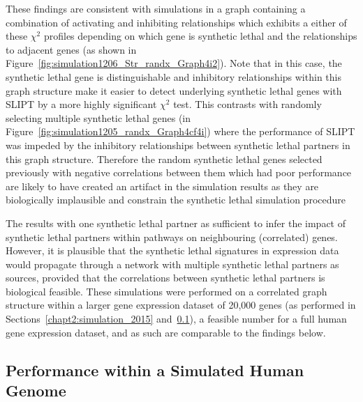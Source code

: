 These findings are consistent with simulations in a graph containing a combination of activating and inhibiting relationships which exhibits a either of these $\chi^2$ profiles depending on which gene is synthetic lethal and the relationships to adjacent genes (as shown in Figure~\ref{fig:simulation1206_Str_randx_Graph4i2}). Note that in this case, the synthetic lethal gene is distinguishable and inhibitory relationships within this graph structure make it easier to detect underlying synthetic lethal genes with \gls{SLIPT} by a more highly significant $\chi^2$ test. This contrasts with randomly selecting multiple synthetic lethal genes (in Figure~\ref{fig:simulation1205_randx_Graph4cf4i}) where the performance of \gls{SLIPT} was impeded by the inhibitory relationships between synthetic lethal partners in this graph structure. Therefore the random synthetic lethal genes selected previously with negative correlations between them which had poor performance are likely to have created an artifact in the simulation results as they are biologically implausible and constrain the synthetic lethal simulation procedure

The results with one synthetic lethal partner as sufficient to infer the impact of synthetic lethal partners within pathways on neighbouring (correlated) genes. However,  it is plausible that the synthetic lethal signatures in expression data would propagate through a network with multiple synthetic lethal partners as sources, provided that the correlations between synthetic lethal partners is biological feasible. These simulations were performed on a correlated graph structure within a larger gene expression dataset of 20,000 genes (as performed in Sections~\ref{chapt2:simulation_2015} and~\ref{chapt5:graphsim_performance_20K}), a feasible number for a full human gene expression dataset, and as such are comparable to the findings below.

\FloatBarrier

\subsection{Performance within a Simulated Human Genome}
\label{chapt5:graphsim_performance_20K}

\FloatBarrier


